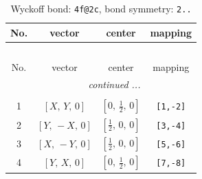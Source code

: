\documentclass[fleqn,8pt]{jsarticle}
\begin{document}
\renewcommand{\arraystretch}{1.2}
\begin{longtable}{cccc}
\caption{Wyckoff bond: {\tt 4f@2c}, bond symmetry: {\tt 2..}}
 \\
 \hline \hline
No. & vector & center & mapping \\ \hline \endfirsthead

\multicolumn{3}{l}{\tablename\ \thetable{}} \\
 \hline \hline
No. & vector & center & mapping \\ \hline \endhead

 \hline \hline
\multicolumn{3}{r}{\footnotesize\it continued ...} \\ \endfoot

 \hline \hline
\multicolumn{3}{r}{} \\ \endlastfoot

1 & $\left[ X,\, Y,\, 0 \right]$ & $\left[ 0,\, \frac{1}{2},\, 0 \right]$ & {\tt [1,-2]} \\ \hline
2 & $\left[ Y,\, - X,\, 0 \right]$ & $\left[ \frac{1}{2},\, 0,\, 0 \right]$ & {\tt [3,-4]} \\ \hline
3 & $\left[ X,\, - Y,\, 0 \right]$ & $\left[ \frac{1}{2},\, 0,\, 0 \right]$ & {\tt [5,-6]} \\ \hline
4 & $\left[ Y,\, X,\, 0 \right]$ & $\left[ 0,\, \frac{1}{2},\, 0 \right]$ & {\tt [7,-8]} \\
\end{longtable}
\renewcommand{\arraystretch}{1.2}
\end{document}
